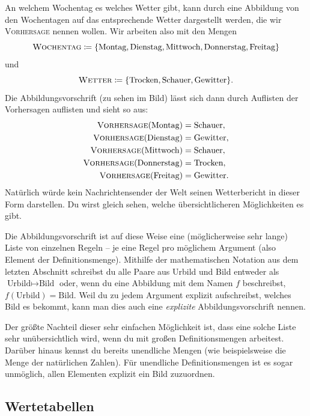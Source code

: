 \documentclass[../../main.tex]{subfiles}
\begin{document}
\begin{example}
    An welchem Wochentag es welches Wetter gibt, kann durch eine Abbildung von den Wochentagen auf das entsprechende Wetter dargestellt werden, die wir \textsc{Vorhersage} nennen wollen. Wir arbeiten also mit den Mengen \[\textsc{Wochentag}\coloneqq\{\text{Montag},\text{Dienstag},\text{Mittwoch},\text{Donnerstag},\text{Freitag}\}\] und \[\textsc{Wetter}\coloneqq\{\text{Trocken},\text{Schauer},\text{Gewitter}\}.\]
    Die Abbildungsvorschrift (zu sehen im Bild) lässt sich dann durch Auflisten der Vorhersagen auflisten und sieht so aus:
    \begin{align*}
        \textsc{Vorhersage}(\text{Montag})&=\text{Schauer},\\ \textsc{Vorhersage}(\text{Dienstag})&=\text{Gewitter},\\ \textsc{Vorhersage}(\text{Mittwoch})&=\text{Schauer},\\ \textsc{Vorhersage}(\text{Donnerstag})&=\text{Trocken},\\ \textsc{Vorhersage}(\text{Freitag})&=\text{Gewitter}.
    \end{align*}
    Natürlich würde kein Nachrichtensender der Welt seinen Wetterbericht in dieser Form darstellen. Du wirst gleich sehen, welche übersichtlicheren Möglichkeiten es gibt.
\end{example}

Die Abbildungsvorschrift ist auf diese Weise eine (möglicherweise sehr lange) Liste von einzelnen Regeln -- je eine Regel pro möglichem Argument (also Element der Definitionsmenge).
Mithilfe der mathematischen Notation aus dem letzten Abschnitt schreibst du alle Paare aus Urbild und Bild entweder als \mbox{$\text{Urbild}\mapsto\text{Bild}$} oder, wenn du eine Abbildung mit dem Namen $f$ beschreibst, \mbox{$f(\text{Urbild})=\text{Bild}$}. Weil du zu jedem Argument explizit aufschreibst, welches Bild es bekommt, kann man dies auch eine \emph{explizite} Abbildungsvorschrift nennen.

Der größte Nachteil dieser sehr einfachen Möglichkeit ist, dass eine solche Liste sehr unübersichtlich wird, wenn du mit großen Definitionsmengen arbeitest. Darüber hinaus kennst du bereits unendliche Mengen (wie beispielsweise die Menge \Natural{} der natürlichen Zahlen). Für unendliche Definitionsmengen ist es sogar unmöglich, allen Elementen explizit ein Bild zuzuordnen.

\subsection{Wertetabellen}
\label{sec:abbildungen_wertetabellen}
\end{document}
